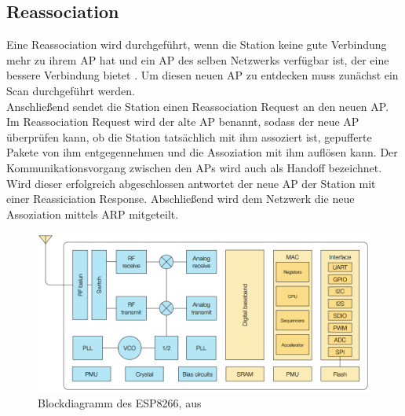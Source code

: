 \subsection{Reassociation}
Eine Reassociation wird durchgeführt, wenn die Station keine gute Verbindung mehr zu ihrem AP hat und ein AP des selben Netzwerks verfügbar ist, der eine bessere Verbindung bietet \cite{ieee2012reassociate}.
Um diesen neuen AP zu entdecken muss zunächst ein Scan durchgeführt werden. \\
Anschließend sendet die Station einen Reassociation Request an den neuen AP. 
Im Reassociation Request wird der alte AP benannt, sodass der neue AP überprüfen kann, ob die Station tatsächlich mit ihm assoziert ist, gepufferte Pakete von ihm entgegennehmen und die Assoziation mit ihm auflösen kann.
Der Kommunikationsvorgang zwischen den APs wird auch als Handoff bezeichnet. 
Wird dieser erfolgreich abgeschlossen antwortet der neue AP der Station mit einer Reassiciation Response.
Abschließend wird dem Netzwerk die neue Assoziation mittels ARP mitgeteilt.

\begin{figure}[h]
  \centering
	\includegraphics[width=\textwidth]{images/espblock.png}
  \caption{Blockdiagramm des ESP8266, aus \cite{espressif2017esp8266}}
  \label{fig:espblock}
\end{figure}

